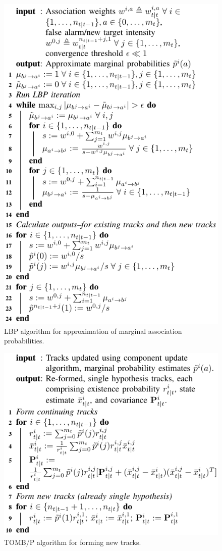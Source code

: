 \documentclass[journal,twoside]{IEEEtran}
\theoremstyle{plain}
\begin{document}
\begin{figure}
\includegraphics{figure9.pdf}
\caption{LBP algorithm for approximation of marginal association probabilities.}
\label{fig:algLBP}
\end{figure}

\begin{figure}
\includegraphics{figure10.pdf}
\caption{TOMB/P algorithm for forming new tracks.}
\label{fig:algTOMMeMBerP}
\end{figure}
\end{document}
